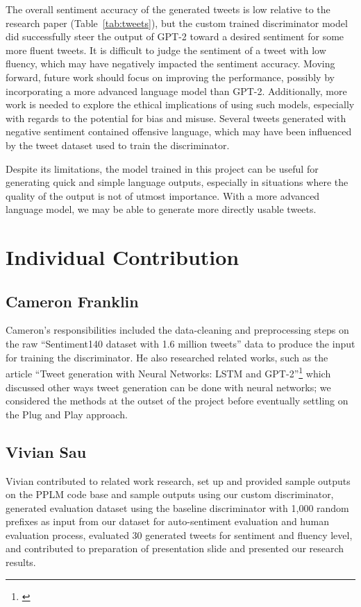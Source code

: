 \documentclass[11pt]{article}
\begin{document}
The overall sentiment accuracy of the generated tweets is low relative to the research paper (Table~\ref{tab:tweets}), but the custom trained discriminator model did successfully steer the output of GPT-2 toward a desired sentiment for some more fluent tweets. It is difficult to judge the sentiment of a tweet with low fluency, which may have negatively impacted the sentiment accuracy. Moving forward, future work should focus on improving the performance, possibly by incorporating a more advanced language model than GPT-2. Additionally, more work is needed to explore the ethical implications of using such models, especially with regards to the potential for bias and misuse. Several tweets generated with negative sentiment contained offensive language, which may have been influenced by the tweet dataset used to train the discriminator.

Despite its limitations, the model trained in this project can be useful for generating quick and simple language outputs, especially in situations where the quality of the output is not of utmost importance. With a more advanced language model, we may be able to generate more directly usable tweets.



\section{Individual Contribution}
\subsection{Cameron Franklin}
Cameron’s responsibilities included the data-cleaning and preprocessing steps on the raw “Sentiment140 dataset with 1.6 million tweets” data to produce the input for training the discriminator.  He also researched related works, such as the article “Tweet generation with Neural Networks: LSTM and GPT-2”\footnote{\citep{lstm-medium}} which discussed other ways tweet generation can be done with neural networks; we considered the methods at the outset of the project before eventually settling on the Plug and Play approach. 

\subsection{Vivian Sau}
Vivian contributed to related work research, set up and provided sample outputs on the PPLM code base and sample outputs using our custom discriminator, generated evaluation dataset using the baseline discriminator with 1,000 random prefixes as input from our dataset for auto-sentiment evaluation and human evaluation process, evaluated 30 generated tweets for sentiment and fluency level, and contributed to preparation of presentation slide and presented our research results.
\end{document}
